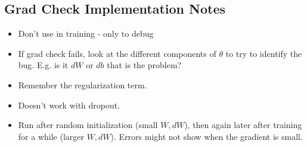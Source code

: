 \subsection*{Grad Check Implementation Notes}
\begin{itemize}
	\item Don't use in training - only to debug
	\item If grad check fails, look at the different components of $\theta$ to try to identify the bug. E.g. is it $dW$ or $db$ that is the problem?
	\item Remember the regularization term.
	\item Doesn't work with dropout.
	\item Run after random initialization (small $W, dW$), then again later after training for a while (larger $W, dW$). Errors might not show when the gradient is small.
\end{itemize}


